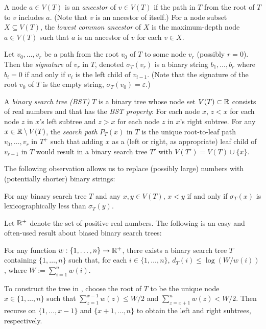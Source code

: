 \documentclass[kpfonts]{patmorin}
\begin{document}
A node $a\in V(T)$ is an \emph{ancestor} of $v\in V(T)$ if the path in $T$ from the root of $T$ to $v$ includes $a$.  (Note that $v$ is an ancestor of itself.) For a node subset $X\subseteq V(T)$, the \emph{lowest common ancestor} of $X$ is the maximum-depth node $a\in V(T)$ such that $a$ is an ancestor of $v$ for each $v\in X$.

Let $v_0,\ldots,v_{r}$ be a path from the root $v_0$ of $T$ to some node $v_r$ (possibly $r=0$).  Then the \emph{signature} of $v_r$ in $T$, denoted $\sigma_T(v_r)$ is a binary string $b_1,\ldots,b_r$ where $b_i=0$ if and only if $v_{i}$ is the left child of $v_{i-1}$.  (Note that the signature of the root $v_0$ of $T$ is the empty string,  $\sigma_T(v_0)=\varepsilon$.)

A \emph{binary search tree (BST)} $T$ is a binary tree  whose node set $V(T)\subset\mathbb{R}$ consists of real numbers and that has the \emph{BST property}:  For each node $x$, $z<x$ for each node $z$ in $x$'s left subtree and $z>x$ for each node $z$ in $x$'s right subtree. For any $x\in\mathbb{R}\setminus V(T)$, the \emph{search path} $P_T(x)$ in $T$ is the unique root-to-leaf path $v_0,\ldots,v_r$ in $T^+$ such that adding $x$ as a (left or right, as appropriate) leaf child of $v_{r-1}$ in $T$ would result in a binary search tree $T'$ with $V(T')=V(T)\cup\{x\}$.

The following observation allows us to replace (possibly large) numbers with (potentially shorter) binary strings:

\begin{obs}
  For any binary search tree $T$ and any $x,y\in V(T)$, $x<y$ if and only if $\sigma_T(x)$ is lexicographically less than $\sigma_T(y)$.
\end{obs}

Let $\mathbb{R}^+$ denote the set of positive real numbers. The following is an easy and often-used result about biased binary search trees:

\begin{lem}
  For any function $w:\{1,\ldots,n\}\to\mathbb{R}^+$, there exists a binary search tree $T$ containing $\{1,\ldots,n\}$ such that, for each $i\in\{1,\ldots,n\}$, $d_T(i)\le\log(W/w(i))$, where $W:=\sum_{i=1}^n w(i)$.
\end{lem}

To construct the tree in , choose the root of $T$ to be the unique node $x\in\{1,\ldots,n\}$ such that $\sum_{z=1}^{x-1} w(z)\le W/2$ and $\sum_{z=x+1}^{n} w(z)< W/2$.  Then recurse on $\{1,\ldots,x-1\}$ and $\{x+1,\ldots,n\}$ to obtain the left and right subtrees, respectively.
\end{document}
